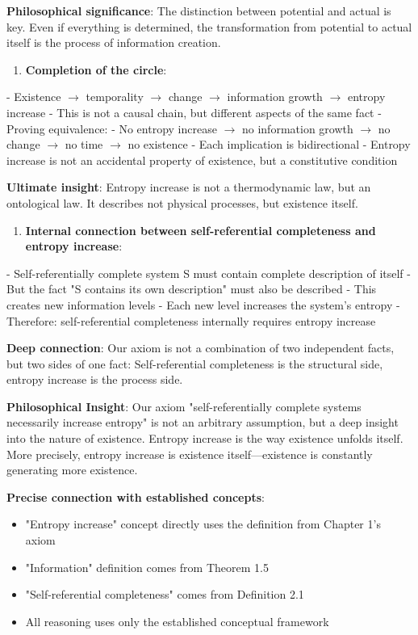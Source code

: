    \textbf{Philosophical significance}: The distinction between potential and actual is key.
   Even if everything is determined, the transformation from potential to actual
   itself is the process of information creation.

\begin{enumerate}
\item \textbf{Completion of the circle}:
\end{enumerate}
   - Existence $\rightarrow$ temporality $\rightarrow$ change $\rightarrow$ information growth $\rightarrow$ entropy increase
   - This is not a causal chain, but different aspects of the same fact
   - Proving equivalence:
     - No entropy increase $\rightarrow$ no information growth $\rightarrow$ no change $\rightarrow$ no time $\rightarrow$ no existence
     - Each implication is bidirectional
   - Entropy increase is not an accidental property of existence, but a constitutive condition
   
   \textbf{Ultimate insight}: Entropy increase is not a thermodynamic law,
   but an ontological law.
   It describes not physical processes, but existence itself.

\begin{enumerate}
\item \textbf{Internal connection between self-referential completeness and entropy increase}:
\end{enumerate}
   - Self-referentially complete system S must contain complete description of itself
   - But the fact "S contains its own description" must also be described
   - This creates new information levels
   - Each new level increases the system's entropy
   - Therefore: self-referential completeness internally requires entropy increase
   
   \textbf{Deep connection}: Our axiom is not a combination of two independent facts,
   but two sides of one fact:
   Self-referential completeness is the structural side, entropy increase is the process side.

\textbf{Philosophical Insight}:
Our axiom "self-referentially complete systems necessarily increase entropy" is not an arbitrary assumption,
but a deep insight into the nature of existence. Entropy increase is the way existence unfolds itself.
More precisely, entropy increase is existence itself---existence is constantly generating more existence.

\textbf{Precise connection with established concepts}:
\begin{itemize}
\item "Entropy increase" concept directly uses the definition from Chapter 1's axiom
\item "Information" definition comes from Theorem 1.5
\item "Self-referential completeness" comes from Definition 2.1
\item All reasoning uses only the established conceptual framework
\end{itemize}

